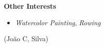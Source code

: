 \documentclass[10pt,a4paper,oneside]{article}
\newlength{\datewidth}
\newlength{\textindent}
\begin{document}
		\vspace{5mm}
		
	\textbf{\hspace{\textindent}Other Interests}
	\begin{itemize}
		\item[\hspace{\datewidth}\scriptsize ] \parbox[t]{\dimexpr\linewidth-\datewidth-\textindent}{\textit{Watercolor Painting}, \textit{Rowing}}
		
	\end{itemize}
	
	\vspace{2cm}
	
	\begin{center}
		(João C, Silva)
	\end{center}
	
\end{document}
